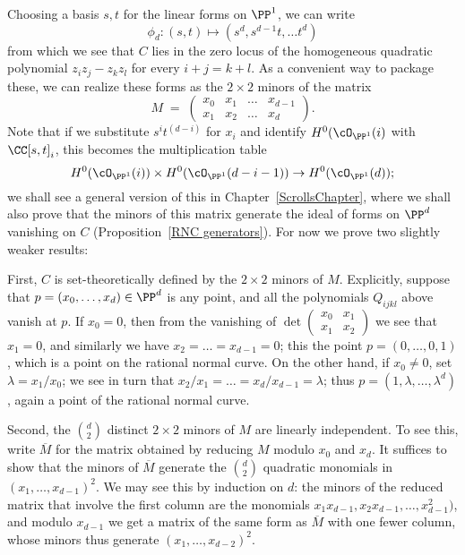 Choosing a basis $s,t$ for the linear forms on $\PP^1$, we can write
$$
\phi_d : (s,t) \mapsto (s^d, s^{d-1}t,\dots t^d)
$$
from which we see that $C$ lies in the zero locus of the homogeneous quadratic polynomial $z_iz_j - z_kz_l$ for every $i+j=k+l$. As a convenient way to package these, we can realize these forms as the $2\times 2$ minors of the matrix
$$
M \; = \; \begin{pmatrix}
x_0 & x_1 & \dots & x_{d-1} \\
x_1 & x_2 & \dots & x_d
\end{pmatrix}.
$$
Note that if we substitute $s^it^{(d-i)}$ for $x_i$ and identify $H^0(\cO_{\PP^1}(i)$ with $\CC[s,t]_i$, this becomes the multiplication table
$$
H^0(\cO_{\PP^1}(i)) \times H^0(\cO_{\PP^1}(d-i-1)) \to H^0(\cO_{\PP^1}(d));
$$
we shall see a general version of this in Chapter~\ref{ScrollsChapter}, where we shall also prove that 
the minors of this matrix generate the ideal of forms on $\PP^d$ vanishing on $C$ (Proposition~\ref{RNC generators}).
For now we prove two slightly weaker results:

First, $C$ is set-theoretically defined by the $2\times 2$ minors of $M$. Explicitly, suppose that $p = (x_0,\dots,x_d) \in \PP^d$ is any point, and all the polynomials $Q_{ijkl}$ above vanish at $p$. If $x_0 = 0$, then from the vanishing of 
$\det \begin{pmatrix}
x_0 & x_1  \\
x_1 & x_2 
\end{pmatrix}$ 
we see that $x_1 = 0$, and similarly we have $x_2 = \dots = x_{d-1}=0$; this the point $p = (0,\dots,0,1)$, which is a point on the rational normal curve. On the other hand, if $x_0 \neq 0$, set $\lambda = x_1/x_0$; we see in turn that $x_2/x_1 = \dots = x_d/x_{d-1} = \lambda$; thus $p = (1, \lambda, \dots,\lambda^d)$, again a point of the rational normal curve.

Second, the ${d\choose 2}$ distinct $2\times 2$ minors of $M$ are linearly independent. To see this, write $\overline M$
for the matrix obtained by reducing $M$
modulo $x_0$ and $x_d$. It suffices to show that the minors of $\overline M$ generate the ${d\choose 2}$ quadratic monomials in $(x_1, \dots, x_{d-1})^2$. We may see this by induction on $d$: the minors of the reduced matrix
that involve the first column are the monomials 
$x_1x_{d-1}, x_2x_{d-1}, \dots, x_{d-1}^2)$, and modulo $x_{d-1}$ we get a matrix of the same form as $\overline M$ with one fewer column, whose
minors thus generate $(x_1, \dots, x_{d-2})^2$.


